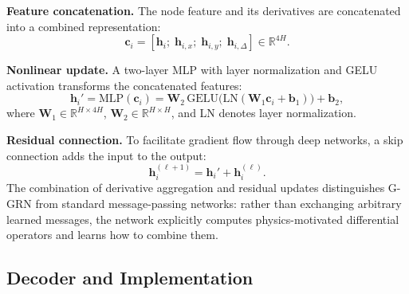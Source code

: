 \documentclass[11pt]{article}
\theoremstyle{definition}
\theoremstyle{remark}
\theoremstyle{plain}
\begin{document}
\textbf{Feature concatenation.} The node feature and its derivatives are concatenated into a combined representation:
\begin{equation}
    \mathbf{c}_i = \left[ \mathbf{h}_i; \; \mathbf{h}_{i,x}; \; \mathbf{h}_{i,y}; \; \mathbf{h}_{i,\Delta} \right] \in \mathbb{R}^{4H}.
\end{equation}

\textbf{Nonlinear update.} A two-layer MLP with layer normalization and GELU activation transforms the concatenated features:
\begin{equation}
    \mathbf{h}_i' = \text{MLP}(\mathbf{c}_i) = \mathbf{W}_2 \, \text{GELU}\bigl(\text{LN}(\mathbf{W}_1 \mathbf{c}_i + \mathbf{b}_1)\bigr) + \mathbf{b}_2,
\end{equation}
where $\mathbf{W}_1 \in \mathbb{R}^{H \times 4H}$, $\mathbf{W}_2 \in \mathbb{R}^{H \times H}$, and LN denotes layer normalization.

\textbf{Residual connection.} To facilitate gradient flow through deep networks, a skip connection adds the input to the output:
\begin{equation}
    \mathbf{h}_i^{(\ell+1)} = \mathbf{h}_i' + \mathbf{h}_i^{(\ell)}.
\end{equation}
The combination of derivative aggregation and residual updates distinguishes G-GRN from standard message-passing networks: rather than exchanging arbitrary learned messages, the network explicitly computes physics-motivated differential operators and learns how to combine them.

\subsection{Decoder and Implementation}
\end{document}
